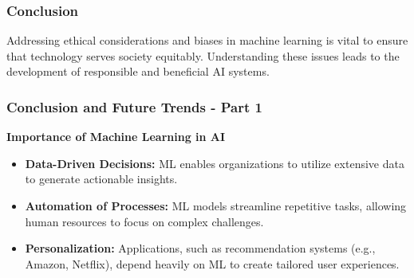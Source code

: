 \documentclass[aspectratio=169]{beamer}
\begin{document}
\begin{frame}
    \frametitle{Conclusion}
    Addressing ethical considerations and biases in machine learning is vital to ensure that technology serves society equitably. Understanding these issues leads to the development of responsible and beneficial AI systems.
\end{frame}

\begin{frame}[fragile]
  \frametitle{Conclusion and Future Trends - Part 1}
  
  \textbf{Importance of Machine Learning in AI} 

  \begin{itemize}
      \item \textbf{Data-Driven Decisions:} 
      ML enables organizations to utilize extensive data to generate actionable insights.
      \item \textbf{Automation of Processes:} 
      ML models streamline repetitive tasks, allowing human resources to focus on complex challenges.
      \item \textbf{Personalization:} 
      Applications, such as recommendation systems (e.g., Amazon, Netflix), depend heavily on ML to create tailored user experiences.
  \end{itemize}
\end{frame}
\end{document}

